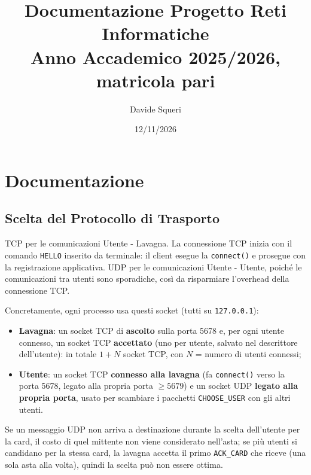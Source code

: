 \documentclass[10pt,a4paper, titlepage]{article}
\author{Davide Squeri}
\title{Documentazione Progetto Reti Informatiche\\[0.3em]
\large{Anno Accademico 2025/2026, matricola pari}}
\date{12/11/2026}
\begin{document}
\section*{Documentazione}
\subsection*{Scelta del Protocollo di Trasporto}
TCP per le comunicazioni Utente - Lavagna. La connessione TCP inizia con il comando \texttt{HELLO} inserito da terminale: il client esegue la \texttt{connect()} e prosegue con la registrazione applicativa.
UDP per le comunicazioni Utente - Utente, poiché le comunicazioni tra utenti sono sporadiche, così da risparmiare l'overhead della connessione TCP.

Concretamente, ogni processo usa questi socket (tutti su \texttt{127.0.0.1}):
\begin{itemize}\setlength{\itemsep}{1pt}\setlength{\parsep}{0pt}
    \item \textbf{Lavagna}: un socket TCP di \textbf{ascolto} sulla porta 5678 e, per ogni utente connesso, un socket TCP \textbf{accettato} (uno per utente, salvato nel descrittore dell'utente): in totale $1 + N$ socket TCP, con $N$ = numero di utenti connessi;
    \item \textbf{Utente}: un socket TCP \textbf{connesso alla lavagna} (fa \texttt{connect()} verso la porta 5678, legato alla propria porta $\geq 5679$) e un socket UDP \textbf{legato alla propria porta}, usato per scambiare i pacchetti \texttt{CHOOSE\_USER} con gli altri utenti.
\end{itemize}

Se un messaggio UDP non arriva a destinazione durante la scelta dell'utente per la card, il costo di quel mittente non viene considerato nell'asta;
se più utenti si candidano per la stessa card, la lavagna accetta il primo \texttt{ACK\_CARD} che riceve (una sola asta alla volta), quindi la scelta può non essere ottima.
\end{document}

